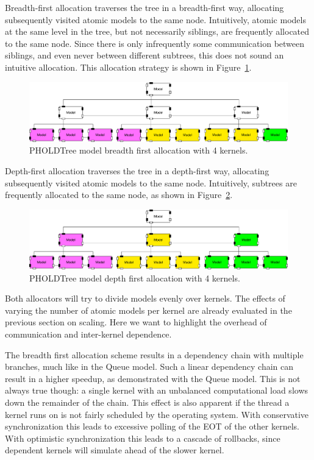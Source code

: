 Breadth-first allocation traverses the tree in a breadth-first way, allocating subsequently visited atomic models to the same node.
Intuitively, atomic models at the same level in the tree, but not necessarily siblings, are frequently allocated to the same node.
Since there is only infrequently some communication between siblings, and even never between different subtrees, this does not sound an intuitive allocation.
This allocation strategy is shown in Figure~\ref{fig:PholdTree_model_bfs}.

\begin{figure}
   \center
   \includegraphics[width=\columnwidth]{fig/pholdtree_alloc_BF.pdf}
   \caption{PHOLDTree model breadth first allocation with 4 kernels.}
   \label{fig:PholdTree_model_bfs}
\end{figure}

Depth-first allocation traverses the tree in a depth-first way, allocating subsequently visited atomic models to the same node.
Intuitively, subtrees are frequently allocated to the same node, as shown in Figure~\ref{fig:PholdTree_model_dfs}.

\begin{figure}
   \center
   \includegraphics[width=\columnwidth]{fig/pholdtree_alloc_DF.pdf}
   \caption{PHOLDTree model depth first allocation with 4 kernels.}
   \label{fig:PholdTree_model_dfs}
\end{figure}

Both allocators will try to divide models evenly over kernels.
The effects of varying the number of atomic models per kernel are already evaluated in the previous section on scaling.
Here we want to highlight the overhead of communication and inter-kernel dependence. 

The breadth first allocation scheme results in a dependency chain with multiple branches, much like in the Queue model.
Such a linear dependency chain can result in a higher speedup, as demonstrated with the Queue model.
This is not always true though: a single kernel with an unbalanced computational load slows down the remainder of the chain.
This effect is also apparent if the thread a kernel runs on is not fairly scheduled by the operating system.
With conservative synchronization this leads to excessive polling of the EOT of the other kernels.
With optimistic synchronization this leads to a cascade of rollbacks, since dependent kernels will simulate ahead of the slower kernel.


